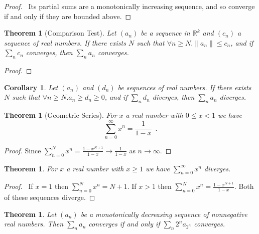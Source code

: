 \documentclass{book}
\let\qed\relax
\newtheorem{cor}{Corollary}[prop]
\newtheorem{thm}[prop]{Theorem}
\theoremstyle{definition}
\begin{document}
\begin{proof}
\pf\ Its partial sums are a monotonically increasing sequence, and so converge if and only if they are bounded above. \qed
\end{proof}

\begin{thm}[Comparison Test]
Let $(a_n)$ be a sequence in $\mathbb{R}^k$ and $(c_n)$ a sequence of real numbers. If there exists $N$ such that $\forall n \geq N. \|a_n\| \leq c_n$, and if $\sum_n c_n$ converges, then $\sum_n a_n$ converges.
\end{thm}

\begin{proof}
\pf
{}
\qed
\end{proof}

\begin{cor}
Let $(a_n)$ and $(d_n)$ be sequences of real numbers. If there exists $N$ such that $\forall n \geq N. a_n \geq d_n \geq 0$, and if $\sum_n d_n$ diverges, then $\sum_n a_n$ diverges.
\end{cor}

\begin{thm}[Geometric Series]
\label{thm:geometric_series}
For $x$ a real number with $0 \leq x < 1$ we have
\[ \sum_{n=0}^\infty x^n = \frac{1}{1-x} \enspace . \]
\end{thm}

\begin{proof}
\pf
Since $\sum_{n=0}^N x^n = \frac{1 - x^{N+1}}{1-x} \rightarrow \frac{1}{1-x}$ as $n \rightarrow \infty$. \qed
\end{proof}

\begin{thm}
For $x$ a real number with $x \geq 1$ we have $\sum_{n=0}^\infty x^n$ diverges.
\end{thm}

\begin{proof}
\pf\ If $x = 1$ then $\sum_{n=0}^N x^n = N + 1$. If $x > 1$ then $\sum_{n=0}^N x^n = \frac{1 - x^{N+1}}{1-x}$. Both of these sequences diverge. \qed
\end{proof}

\begin{thm}
Let $(a_n)$ be a monotonically decreasing sequence of nonnegative real numbers. Then $\sum_n a_n$ converges if and only if $\sum_n 2^n a_{2^n}$ converges.
\end{thm}
\end{document}
